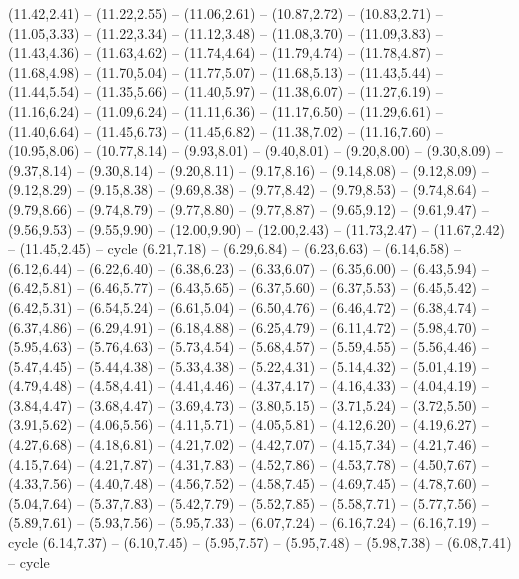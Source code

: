 \expandafter\def\csname geo:gebiet:1945-USSR\endcsname{
  (11.42,2.41) -- (11.22,2.55) -- (11.06,2.61) -- (10.87,2.72) -- (10.83,2.71) -- (11.05,3.33) -- (11.22,3.34) -- (11.12,3.48) -- (11.08,3.70) -- (11.09,3.83) -- (11.43,4.36) -- (11.63,4.62) -- (11.74,4.64) -- (11.79,4.74) -- (11.78,4.87) -- (11.68,4.98) -- (11.70,5.04) -- (11.77,5.07) -- (11.68,5.13) -- (11.43,5.44) -- (11.44,5.54) -- (11.35,5.66) -- (11.40,5.97) -- (11.38,6.07) -- (11.27,6.19) -- (11.16,6.24) -- (11.09,6.24) -- (11.11,6.36) -- (11.17,6.50) -- (11.29,6.61) -- (11.40,6.64) -- (11.45,6.73) -- (11.45,6.82) -- (11.38,7.02) -- (11.16,7.60) -- (10.95,8.06) -- (10.77,8.14) -- (9.93,8.01) -- (9.40,8.01) -- (9.20,8.00) -- (9.30,8.09) -- (9.37,8.14) -- (9.30,8.14) -- (9.20,8.11) -- (9.17,8.16) -- (9.14,8.08) -- (9.12,8.09) -- (9.12,8.29) -- (9.15,8.38) -- (9.69,8.38) -- (9.77,8.42) -- (9.79,8.53) -- (9.74,8.64) -- (9.79,8.66) -- (9.74,8.79) -- (9.77,8.80) -- (9.77,8.87) -- (9.65,9.12) -- (9.61,9.47) -- (9.56,9.53) -- (9.55,9.90) -- (12.00,9.90) -- (12.00,2.43) -- (11.73,2.47) -- (11.67,2.42) -- (11.45,2.45) -- cycle}
\expandafter\def\csname geo:gebiet:1945-SOV\endcsname{
  (6.21,7.18) -- (6.29,6.84) -- (6.23,6.63) -- (6.14,6.58) -- (6.12,6.44) -- (6.22,6.40) -- (6.38,6.23) -- (6.33,6.07) -- (6.35,6.00) -- (6.43,5.94) -- (6.42,5.81) -- (6.46,5.77) -- (6.43,5.65) -- (6.37,5.60) -- (6.37,5.53) -- (6.45,5.42) -- (6.42,5.31) -- (6.54,5.24) -- (6.61,5.04) -- (6.50,4.76) -- (6.46,4.72) -- (6.38,4.74) -- (6.37,4.86) -- (6.29,4.91) -- (6.18,4.88) -- (6.25,4.79) -- (6.11,4.72) -- (5.98,4.70) -- (5.95,4.63) -- (5.76,4.63) -- (5.73,4.54) -- (5.68,4.57) -- (5.59,4.55) -- (5.56,4.46) -- (5.47,4.45) -- (5.44,4.38) -- (5.33,4.38) -- (5.22,4.31) -- (5.14,4.32) -- (5.01,4.19) -- (4.79,4.48) -- (4.58,4.41) -- (4.41,4.46) -- (4.37,4.17) -- (4.16,4.33) -- (4.04,4.19) -- (3.84,4.47) -- (3.68,4.47) -- (3.69,4.73) -- (3.80,5.15) -- (3.71,5.24) -- (3.72,5.50) -- (3.91,5.62) -- (4.06,5.56) -- (4.11,5.71) -- (4.05,5.81) -- (4.12,6.20) -- (4.19,6.27) -- (4.27,6.68) -- (4.18,6.81) -- (4.21,7.02) -- (4.42,7.07) -- (4.15,7.34) -- (4.21,7.46) -- (4.15,7.64) -- (4.21,7.87) -- (4.31,7.83) -- (4.52,7.86) -- (4.53,7.78) -- (4.50,7.67) -- (4.33,7.56) -- (4.40,7.48) -- (4.56,7.52) -- (4.58,7.45) -- (4.69,7.45) -- (4.78,7.60) -- (5.04,7.64) -- (5.37,7.83) -- (5.42,7.79) -- (5.52,7.85) -- (5.58,7.71) -- (5.77,7.56) -- (5.89,7.61) -- (5.93,7.56) -- (5.95,7.33) -- (6.07,7.24) -- (6.16,7.24) -- (6.16,7.19) -- cycle
  (6.14,7.37) -- (6.10,7.45) -- (5.95,7.57) -- (5.95,7.48) -- (5.98,7.38) -- (6.08,7.41) -- cycle}
